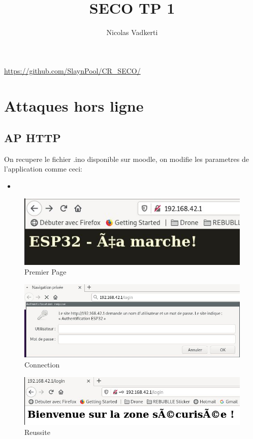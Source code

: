 \documentclass[10pt,a4paper]{article}
\title{SECO TP 1}
\author{Nicolas Vadkerti}
\newcommand{\insertcode}[2]{\begin{itemize}\item[]\end{itemize}}
\begin{document}
\maketitle
\url{https://github.com/SlaynPool/CR_SECO/}
\section{Attaques hors ligne}

\subsection{AP HTTP}
On recupere le fichier .ino disponible sur moodle, on modifie les parametres de l'application comme ceci:
\insertcode{code/AP_HTTPHead.ino}{Modification du .ino}
\begin{figure}[h!]
\centering
\includegraphics[scale=0.20]{image/1.jpg}
\caption{Premier Page}
\label{fig:net }
\end{figure}

 \begin{figure}[h!]
\centering
\includegraphics[scale=0.20]{image/2.jpg}
\caption{Connection }
\label{fig:net }
\end{figure}
\begin{figure}[h!]
\centering
\includegraphics[scale=0.20]{image/3.jpg}
\caption{Reussite }
\label{fig:net }
\end{figure}
\end{document}
